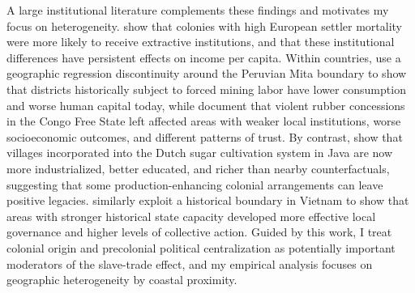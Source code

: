\documentclass[12pt]{article}
\begin{document}
A large institutional literature complements these findings and motivates my focus on heterogeneity. \citet{acemoglu2001} show that colonies with high European settler mortality were more likely to receive extractive institutions, and that these institutional differences have persistent effects on income per capita. Within countries, \citet{dell2010} use a geographic regression discontinuity around the Peruvian Mita boundary to show that districts historically subject to forced mining labor have lower consumption and worse human capital today, while \citet{lowesmontero2017} document that violent rubber concessions in the Congo Free State left affected areas with weaker local institutions, worse socioeconomic outcomes, and different patterns of trust. By contrast, \citet{dellolken2019} show that villages incorporated into the Dutch sugar cultivation system in Java are now more industrialized, better educated, and richer than nearby counterfactuals, suggesting that some production-enhancing colonial arrangements can leave positive legacies. \citet{delllanequerubin2018} similarly exploit a historical boundary in Vietnam to show that areas with stronger historical state capacity developed more effective local governance and higher levels of collective action. Guided by this work, I treat colonial origin and precolonial political centralization as potentially important moderators of the slave-trade effect, and my empirical analysis focuses on geographic heterogeneity by coastal proximity.
\end{document}
